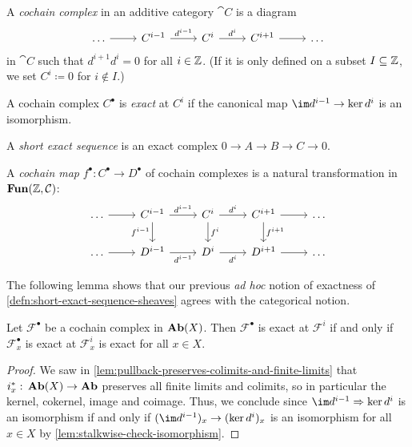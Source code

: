 \begin{defn}
A \emph{cochain complex} in an additive category \(\cat C\) is a diagram
\begin{equation*}
  \begin{tikzcd}
    \ldots \ar[r] & C^{i-1} \ar[r, "d^{i-1}"] & C^i \ar[r, "d^i"] & C^{i+1} \ar[r] & \ldots
  \end{tikzcd}
\end{equation*}
in \(\cat C\) such that \(d^{i+1}d^i=0\) for all \(i\in\mathbb{Z}\).
(If it is only defined on a subset \(I\subseteq\mathbb{Z}\), we set \(C^i\coloneq 0\) for \(i\notin I\).)

A cochain complex \(C^\bullet\) is \emph{exact} at \(C^i\) if the canonical map \(\im d^{i-1}\to\ker d^i\) is an isomorphism.

A \emph{short exact sequence} is an exact complex \(0\to A\to B\to C\to 0\).

A \emph{cochain map} \(f^\bullet\colon C^\bullet\to D^\bullet\) of cochain complexes is a natural transformation in \(\operatorname{\mathbf{Fun}}(\mathbb{Z},\mathcal{C})\):
\begin{equation*}
  \begin{tikzcd}
    \ldots \ar[r] & C^{i-1} \ar[r, "d^{i-1}"] \ar[d, "f^{i-1}"'] & C^i \ar[r, "d^i"] \ar[d, "f^i"] & C^{i+1} \ar[r] \ar[d, "f^{i+1}"] & \ldots \\
    \ldots \ar[r] & D^{i-1} \ar[r, "d^{i-1}"'] & D^i \ar[r, "d^i"'] & D^{i+1} \ar[r] & \ldots
  \end{tikzcd}
\end{equation*}
\end{defn}

The following lemma shows that our previous \emph{ad hoc} notion of exactness of \cref{defn:short-exact-sequence-sheaves} agrees with the categorical notion.

\begin{lem}
Let \(\mathcal F^\bullet\) be a cochain complex in \(\operatorname{\mathbf{Ab}}(X)\).
Then \(\mathcal F^\bullet\) is exact at \(\mathcal F^i\) if and only if \(\mathcal F^\bullet_x\) is exact at \(\mathcal F^i_x\) is exact for all \(x\in X\).
\end{lem}

\begin{proof}
We saw in \cref{lem:pullback-preserves-colimits-and-finite-limits} that \(i_x^*\colon\catAbelianSheaf(X)\to\catAbelianGroup\) preserves all finite limits and colimits, so in particular the kernel, cokernel, image and coimage.
Thus, we conclude since \(\im d^{i-1}\To\ker d^i\) is an isomorphism if and only if \((\im d^{i-1})_x\to(\ker d^i)_x\) is an isomorphism for all \(x\in X\) by \cref{lem:stalkwise-check-isomorphism}.
\end{proof}

